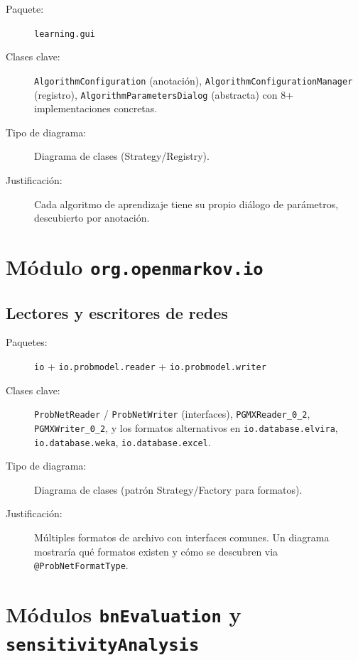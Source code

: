 \documentclass[11pt,a4paper]{article}
\newcommand{\code}[1]{\texttt{#1}}
\newcommand{\pkg}[1]{\texttt{\small #1}}
\begin{document}
\begin{description}
  \item[Paquete:] \pkg{learning.gui}
  \item[Clases clave:] \code{AlgorithmConfiguration} (anotaci\'on),
        \code{AlgorithmConfigurationManager} (registro),
        \code{AlgorithmParametersDialog} (abstracta) con 8+
        implementaciones concretas.
  \item[Tipo de diagrama:] Diagrama de clases (Strategy/Registry).
  \item[Justificaci\'on:] Cada algoritmo de aprendizaje tiene su propio
        di\'alogo de par\'ametros, descubierto por anotaci\'on.
\end{description}

\section{M\'odulo \code{org.openmarkov.io}}

\subsection{Lectores y escritores de redes}

\begin{description}
  \item[Paquetes:] \pkg{io} + \pkg{io.probmodel.reader} +
        \pkg{io.probmodel.writer}
  \item[Clases clave:] \code{ProbNetReader} / \code{ProbNetWriter}
        (interfaces), \code{PGMXReader\_0\_2}, \code{PGMXWriter\_0\_2},
        y los formatos alternativos en \code{io.database.elvira},
        \code{io.database.weka}, \code{io.database.excel}.
  \item[Tipo de diagrama:] Diagrama de clases (patr\'on Strategy/Factory
        para formatos).
  \item[Justificaci\'on:] M\'ultiples formatos de archivo con
        interfaces comunes.  Un diagrama mostrar\'ia qu\'e formatos
        existen y c\'omo se descubren via \code{@ProbNetFormatType}.
\end{description}

\section{M\'odulos \code{bnEvaluation} y \code{sensitivityAnalysis}}
\end{document}
